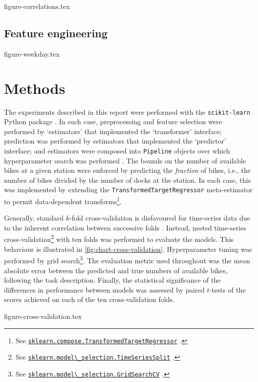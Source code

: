 \documentclass[11pt]{extarticle}
\newcommand{\sklearn}[1]{
  \href{https://scikit-learn.org/stable/modules/generated/sklearn.#1.html}{\lstinline|sklearn.#1|}
}
\begin{document}
{figure-correlations.tex}

\subsection{Feature engineering}
\label{sec:feature-engineering}

{figure-weekday.tex}

\section{Methods}
\label{sec:methods}

The experiments described in this report were performed with the \texttt{scikit-learn}
Python package \parencite{Pedregosa2011}.
In each case, preprocessing and feature selection were performed by `estimators' that
implemented the `transformer' interface; prediction was performed by estimators that
implemented the `predictor' interface; and estimators were composed into
\texttt{Pipeline} objects over which hyperparameter search was performed
\parencite[4-9]{Buitinck2013}.
The bounds on the number of available bikes at a given station were enforced by
predicting the \emph{fraction} of bikes, i.e., the number of bikes divided by the number
of docks at the station.
In each case, this was implemented by extending the \texttt{TransformedTargetRegressor}
meta-estimator to permit data-dependent
transforms\footnote{See \sklearn{compose.TransformedTargetRegressor}.}.

Generally, standard $k$-fold cross-validation is disfavoured for time-series data due
to the inherent correlation between successive folds \parencite{Bergmeir2018}.
Instead, nested time-series
cross-validation\footnote{See \sklearn{model\_selection.TimeSeriesSplit}.} with ten folds
was performed to evaluate the models.
This behaviour is illustrated in \cref{fig:chart-cross-validation}.
Hyperparameter tuning was performed by grid
search\footnote{See \sklearn{model\_selection.GridSearchCV}.}.
The evaluation metric used throughout was the mean absolute error between the predicted
and true numbers of available bikes, following the task description.
Finally, the statistical significance of the differences in performance between models
was assessed by paired $t$-tests of the scores achieved on each of the ten
cross-validation folds.

{figure-cross-validation.tex}
\end{document}
